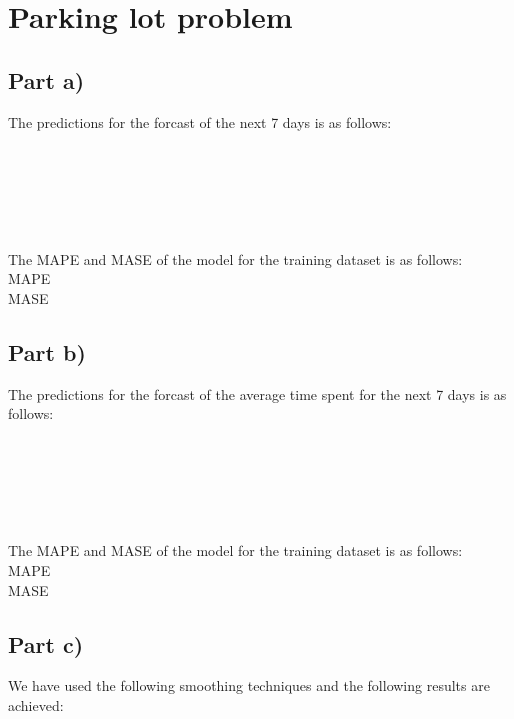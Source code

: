\section{Parking lot problem}
\subsection{Part a)}
The predictions for the forcast of the next 7 days is as follows:
\\
\\
\\
\\
\\
\\
\\


The MAPE and MASE of the model for the training dataset is as follows: \\
MAPE \\
MASE \\


\subsection{Part b)}
The predictions for the forcast of the average time spent for the  next 7 days is as follows:
\\
\\
\\
\\
\\
\\
\\


The MAPE and MASE of the model for the training dataset is as follows: \\
MAPE \\
MASE \\

\subsection{Part c)}
We have used the following smoothing techniques and the following results are achieved:
